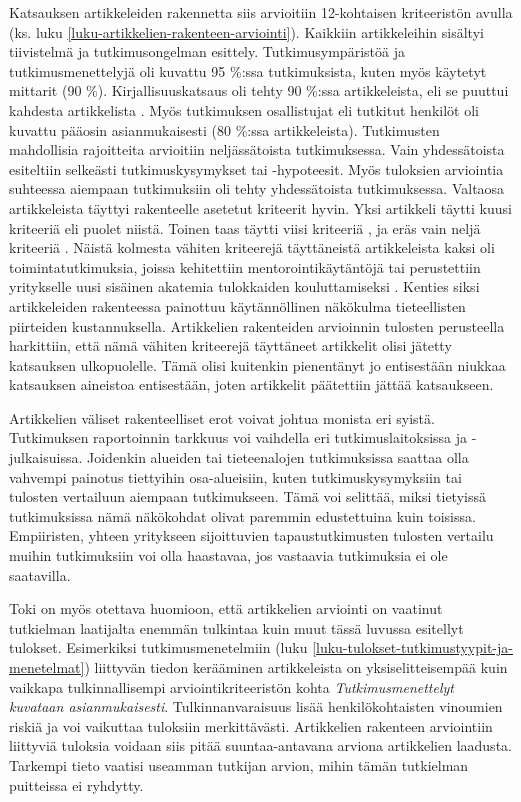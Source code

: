 \documentclass[utf8]{gradu3}
\begin{document}
Katsauksen artikkeleiden rakennetta siis arvioitiin 12-kohtaisen kriteeristön avulla (ks. luku \ref{luku-artikkelien-rakenteen-arviointi}). Kaikkiin artikkeleihin sisältyi tiivistelmä ja tutkimusongelman esittely. Tutkimusympäristöä ja tutkimusmenettelyjä oli kuvattu 95 \%:ssa tutkimuksista, kuten myös käytetyt mittarit (90 \%). Kirjallisuuskatsaus oli tehty 90 \%:ssa artikkeleista, eli se puuttui kahdesta artikkelista %
\parencites%
    {shannon-pool-2016}%
    {kulkarni-ym-2010}%
\relax.
%
Myös tutkimuksen osallistujat eli tutkitut henkilöt oli kuvattu pääosin asianmukaisesti (80 \%:ssa artikkeleista). Tutkimusten mahdollisia rajoitteita arvioitiin neljässätoista tutkimuksessa. Vain yhdessätoista esiteltiin selkeästi tutkimuskysymykset tai -hypoteesit. Myös tuloksien arviointia suhteessa aiempaan tutkimuksiin oli tehty yhdessätoista tutkimuksessa. Valtaosa artikkeleista täyttyi rakenteelle asetetut kriteerit hyvin. Yksi artikkeli \parencite{shannon-pool-2016} täytti kuusi kriteeriä eli puolet niistä. Toinen taas täytti viisi kriteeriä \parencite{kumar-ym-2016}, ja eräs vain neljä kriteeriä \parencite{bjornson-dingsøyr-2005}. Näistä kolmesta vähiten kriteerejä täyttäneistä artikkeleista kaksi oli toimintatutkimuksia, joissa kehitettiin mentorointikäytäntöjä \parencite{bjornson-dingsøyr-2005} tai perustettiin yritykselle uusi sisäinen akatemia tulokkaiden kouluttamiseksi \parencite{shannon-pool-2016}. Kenties siksi artikkeleiden rakenteessa painottuu käytännöllinen näkökulma tieteellisten piirteiden kustannuksella. Artikkelien rakenteiden arvioinnin tulosten perusteella harkittiin, että nämä vähiten kriteerejä täyttäneet artikkelit olisi jätetty katsauksen ulkopuolelle. Tämä olisi kuitenkin pienentänyt jo entisestään niukkaa katsauksen aineistoa entisestään, joten artikkelit päätettiin jättää katsaukseen.

Artikkelien väliset rakenteelliset erot voivat johtua monista eri syistä. Tutkimuksen raportoinnin tarkkuus voi vaihdella eri tutkimuslaitoksissa ja -julkaisuissa. Joidenkin alueiden tai tieteenalojen tutkimuksissa saattaa olla vahvempi painotus tiettyihin osa-alueisiin, kuten tutkimuskysymyksiin tai tulosten vertailuun aiempaan tutkimukseen. Tämä voi selittää, miksi tietyissä tutkimuksissa nämä näkökohdat olivat paremmin edustettuina kuin toisissa. Empiiristen, yhteen yritykseen sijoittuvien tapaustutkimusten tulosten vertailu muihin tutkimuksiin voi olla haastavaa, jos vastaavia tutkimuksia ei ole saatavilla.

Toki on myös otettava huomioon, että artikkelien arviointi on vaatinut tutkielman laatijalta enemmän tulkintaa kuin muut tässä luvussa esitellyt tulokset. Esimerkiksi tutkimusmenetelmiin (luku \ref{luku-tulokset-tutkimustyypit-ja-menetelmat}) liittyvän tiedon kerääminen artikkeleista on yksiselitteisempää kuin vaikkapa tulkinnallisempi arviointikriteeristön kohta \textit{Tutkimusmenettelyt kuvataan asianmukaisesti}. Tulkinnanvaraisuus lisää henkilökohtaisten vinoumien riskiä ja voi vaikuttaa tuloksiin merkittävästi. Artikkelien rakenteen arviointiin liittyviä tuloksia voidaan siis pitää suuntaa-antavana arviona artikkelien laadusta. Tarkempi tieto vaatisi useamman tutkijan arvion, mihin tämän tutkielman puitteissa ei ryhdytty.
\end{document}
